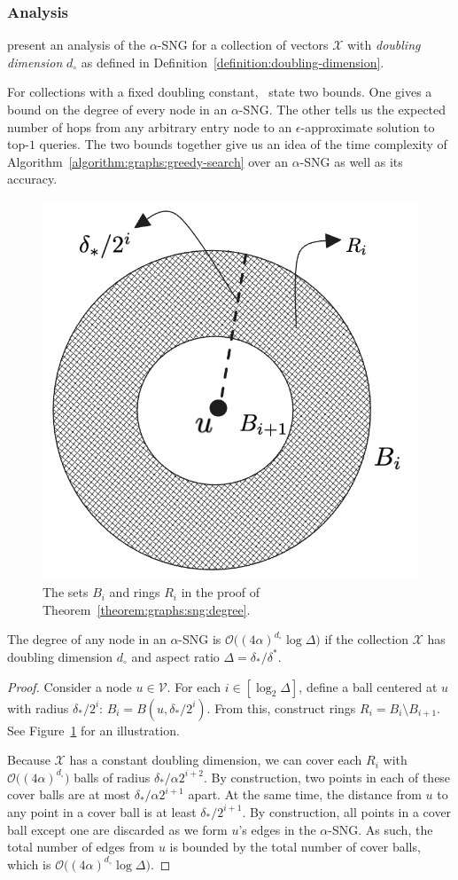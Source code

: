 \subsubsection{Analysis}
\cite{indyk2023worstcase} present an analysis of the $\alpha$-SNG
for a collection of vectors $\mathcal{X}$ with \emph{doubling dimension} $d_\circ$
as defined in Definition~\ref{definition:doubling-dimension}.

For collections with a fixed doubling constant,~\cite{indyk2023worstcase} state two bounds. 
One gives a bound on the degree of every node in an $\alpha$-SNG. The other tells us
the expected number of hops from any arbitrary entry node to an $\epsilon$-approximate
solution to top-$1$ queries. The two bounds together give us an idea of the time complexity
of Algorithm~\ref{algorithm:graphs:greedy-search} over an $\alpha$-SNG as well as its
accuracy.

\begin{figure}[t]
    \centering
    \includegraphics[width=0.3\linewidth]{figures/graphs-sng-proof.png}
    \caption{The sets $B_i$ and rings $R_i$ in the proof of Theorem~\ref{theorem:graphs:sng:degree}.}
    \label{figure:graphs:sng:proof}
\end{figure}

\begin{theorem}
    \label{theorem:graphs:sng:degree}
    The degree of any node in an $\alpha$-SNG is
    $\mathcal{O}\big( (4\alpha)^{d_\circ} \log \Delta \big)$ if the collection
    $\mathcal{X}$ has doubling dimension $d_\circ$ and aspect ratio $\Delta = \delta_\ast / \delta^\ast$.
\end{theorem}
\begin{proof}
    Consider a node $u \in \mathcal{V}$. For each $i \in [\log_2 \Delta]$, define
    a ball centered at $u$ with radius $\delta_\ast / 2^i$: $B_i = B(u, \delta_\ast / 2^i)$.
    From this, construct rings $R_i = B_i \setminus B_{i + 1}$. See Figure~\ref{figure:graphs:sng:proof}
    for an illustration.

    Because $\mathcal{X}$ has a constant doubling dimension, we can cover each $R_i$
    with $\mathcal{O}\big( (4\alpha)^{d_\circ} \big)$ balls of radius $\delta_\ast / \alpha 2^{i + 2}$.
    By construction, two points in each of these cover balls are at
    most $\delta_\ast / \alpha 2^{i + 1}$ apart. At the same time, the distance from $u$ to
    any point in a cover ball is at least $\delta_\ast / 2^{i + 1}$. By construction, all points
    in a cover ball except one are discarded as we form $u$'s edges in the $\alpha$-SNG.
    As such, the total number of edges from $u$ is bounded by the total number of cover balls,
    which is $\mathcal{O}\big( (4\alpha)^{d_\circ} \log \Delta \big)$.
\end{proof}

